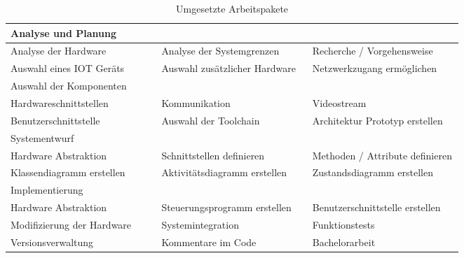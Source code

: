 \documentclass[BMR,Bachelor,ngerman]{twbook}%
\begin{document}
\begin{table}[!htbp]
\caption{Umgesetzte Arbeitspakete}
\label{tab:results}
\centering
\begin{tabular}{| p{0.33\linewidth}| p{0.33\linewidth} | p{0.33\linewidth}|}
\rowcolor[gray]{0.8}Analyse und Planung\\\hline
Analyse der Hardware & Analyse der Systemgrenzen & Recherche / Vorgehensweise\\\hline
Auswahl eines \ac{IOT} Geräts & Auswahl zusätzlicher Hardware & Netzwerkzugang ermöglichen\\\hline
\rowcolor[gray]{0.8}Auswahl der Komponenten\\\hline
Hardwareschnittstellen & Kommunikation & Videostream\\\hline
Benutzerschnittstelle & Auswahl der Toolchain & Architektur Prototyp erstellen\\\hline
\rowcolor[gray]{0.8}Systementwurf\\\hline
Hardware Abstraktion & Schnittstellen definieren & Methoden / Attribute definieren\\\hline
Klassendiagramm erstellen & Aktivitätsdiagramm erstellen & Zustandsdiagramm erstellen\\\hline
\rowcolor[gray]{0.8}Implementierung\\\hline
Hardware Abstraktion& Steuerungsprogramm erstellen & Benutzerschnittstelle erstellen\\\hline
Modifizierung der Hardware & Systemintegration & Funktionstests \\\hline
Versionsverwaltung & Kommentare im Code & Bachelorarbeit\\\hline
\end{tabular}
\end{table}
%
\clearpage
\end{document}
